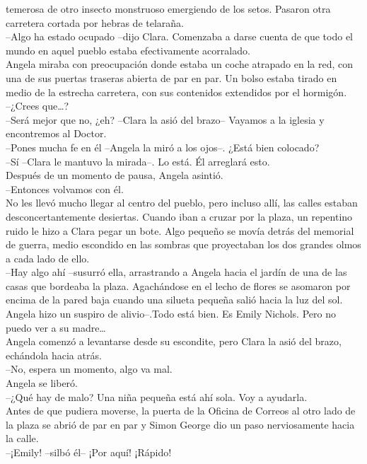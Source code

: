 temerosa de otro insecto monstruoso emergiendo de los setos. Pasaron
otra carretera cortada por hebras de telaraña.\\
--Algo ha estado ocupado --dijo Clara. Comenzaba a darse cuenta de que
todo el mundo en aquel pueblo estaba efectivamente acorralado.\\
Angela miraba con preocupación donde estaba un coche atrapado en la red,
con una de sus puertas traseras abierta de par en par. Un bolso estaba
tirado en medio de la estrecha carretera, con sus contenidos extendidos
por el hormigón.\\
--¿Crees que\ldots{}?\\
--Será mejor que no, ¿eh? --Clara la asió del brazo-- Vayamos a la
iglesia y encontremos al Doctor.\\
--Pones mucha fe en él --Angela la miró a los ojos--. ¿Está bien
colocado?\\
--Sí --Clara le mantuvo la mirada--. Lo está. Él arreglará esto.\\
Después de un momento de pausa, Angela asintió.\\
--Entonces volvamos con él.\\
No les llevó mucho llegar al centro del pueblo, pero incluso allí, las
calles estaban desconcertantemente desiertas. Cuando iban a cruzar por
la plaza, un repentino ruido le hizo a Clara pegar un bote. Algo pequeño
se movía detrás del memorial de guerra, medio escondido en las sombras
que proyectaban los dos grandes olmos a cada lado de ello.\\
--Hay algo ahí --susurró ella, arrastrando a Angela hacia el jardín de
una de las casas que bordeaba la plaza. Agachándose en el lecho de
flores se asomaron por encima de la pared baja cuando una silueta
pequeña salió hacia la luz del sol. Angela hizo un suspiro de
alivio--.Todo está bien. Es Emily Nichols. Pero no puedo ver a su
madre\ldots{}\\
Angela comenzó a levantarse desde su escondite, pero Clara la asió del
brazo, echándola hacia atrás.\\
--No, espera un momento, algo va mal.\\
Angela se liberó.\\
--¿Qué hay de malo? Una niña pequeña está ahí sola. Voy a ayudarla.\\
Antes de que pudiera moverse, la puerta de la Oficina de Correos al otro
lado de la plaza se abrió de par en par y Simon George dio un paso
nerviosamente hacia la calle.\\
--¡Emily! --silbó él-- ¡Por aquí! ¡Rápido!\\
